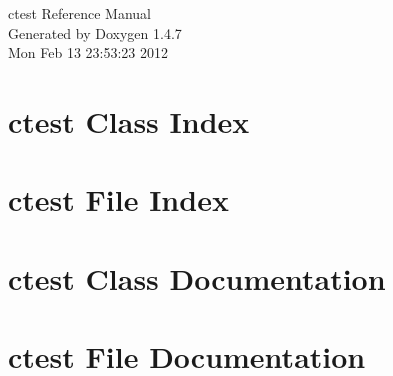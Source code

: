 \documentclass[a4paper]{book}
\begin{document}
\begin{titlepage}
\vspace*{7cm}
\begin{center}
{\Large ctest Reference Manual}\\
\vspace*{1cm}
{\large Generated by Doxygen 1.4.7}\\
\vspace*{0.5cm}
{\small Mon Feb 13 23:53:23 2012}\\
\end{center}
\end{titlepage}
\clearemptydoublepage
{}
\tableofcontents
\clearemptydoublepage
{}
\chapter{ctest Class Index}

\chapter{ctest File Index}

\chapter{ctest Class Documentation}


\chapter{ctest File Documentation}






\printindex
\end{document}
